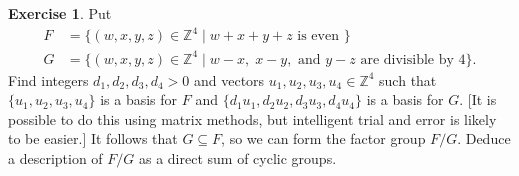 \documentclass{amsart}
\newcommand{\Z}         {{\mathbb{Z}}}
\newcommand{\sse}       {\subseteq}
\newcommand{\st}        {\;|\;}
\renewcommand{\:}{\colon}
\theoremstyle{definition}
\newtheorem{exercise}{Exercise}[section]
\begin{document}
\begin{exercise}
 Put
 \begin{align*}
  F &= \{(w,x,y,z)\in\Z^4\st w+x+y+z \text{ is even }\} \\
  G &= \{(w,x,y,z)\in\Z^4\st 
          w-x,\;x-y,\text{ and } y-z 
          \text{ are divisible by } 4 \}.
 \end{align*}
 Find integers $d_1,d_2,d_3,d_4>0$ and vectors
 $u_1,u_2,u_3,u_4\in\Z^4$ such that $\{u_1,u_2,u_3,u_4\}$ is a basis
 for $F$ and $\{d_1u_1,d_2u_2,d_3u_3,d_4u_4\}$ is a basis for $G$.
 [It is possible to do this using matrix methods, but intelligent
 trial and error is likely to be easier.]  It follows that $G\sse F$,
 so we can form the factor group $F/G$.  Deduce a description of $F/G$
 as a direct sum of cyclic groups.
\end{exercise}
\end{document}
